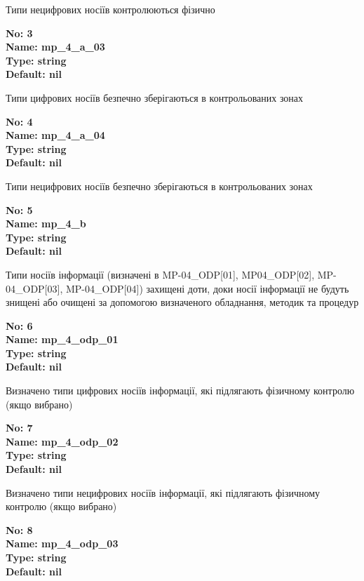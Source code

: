 \documentclass{article}
\begin{document}
{\footnotesize Типи нецифрових носіїв контролюються фізично}


{\footnotesize\bfseries
No: 3\\
Name: mp\_\allowbreak{}4\_\allowbreak{}a\_\allowbreak{}03\\
Type: string\\
Default: nil
}

{\footnotesize Типи цифрових носіїв безпечно зберігаються в контрольованих зонах}


{\footnotesize\bfseries
No: 4\\
Name: mp\_\allowbreak{}4\_\allowbreak{}a\_\allowbreak{}04\\
Type: string\\
Default: nil
}

{\footnotesize Типи нецифрових носіїв безпечно зберігаються в контрольованих зонах}


{\footnotesize\bfseries
No: 5\\
Name: mp\_\allowbreak{}4\_\allowbreak{}b\\
Type: string\\
Default: nil
}

{\footnotesize Типи носіїв інформації (визначені в MP-04\_\allowbreak{}ODP[01], MP04\_\allowbreak{}ODP[02], MP-04\_\allowbreak{}ODP[03], MP-04\_\allowbreak{}ODP[04]) захищені доти, доки носії інформації не будуть знищені або очищені за допомогою визначеного обладнання, методик та процедур}


{\footnotesize\bfseries
No: 6\\
Name: mp\_\allowbreak{}4\_\allowbreak{}odp\_\allowbreak{}01\\
Type: string\\
Default: nil
}

{\footnotesize Визначено типи цифрових носіїв інформації, які підлягають фізичному контролю (якщо вибрано)}


{\footnotesize\bfseries
No: 7\\
Name: mp\_\allowbreak{}4\_\allowbreak{}odp\_\allowbreak{}02\\
Type: string\\
Default: nil
}

{\footnotesize Визначено типи нецифрових носіїв інформації, які підлягають фізичному контролю (якщо вибрано)}


{\footnotesize\bfseries
No: 8\\
Name: mp\_\allowbreak{}4\_\allowbreak{}odp\_\allowbreak{}03\\
Type: string\\
Default: nil
}
\end{document}
